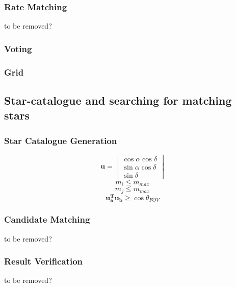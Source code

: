 \documentclass[12pt,a4paper,oneside]{article}
\begin{document}
\cite{mortari2004pyramid}\par


\subsubsection{Rate Matching}
\cite{samaan2005recursive}
to be removed?
\subsubsection{Voting}
\cite{kolomenkin2008geometric} \par
\subsubsection{Grid}
\cite{padgett1997grid}
\subsection{Star-catalogue and searching for matching stars}

\subsubsection{Star Catalogue Generation}
\begin{equation}
\bm{u} = \begin{bmatrix}
\cos \alpha \cos \delta \\
\sin \alpha \cos \delta \\
\sin \delta
\end{bmatrix}
\end{equation}
\begin{equation}
m_i \leq m_{max}
\end{equation}
\begin{equation}
m_j \leq m_{max}
\end{equation}
\begin{equation}
\bm{u_a^T u_b} \geq \cos \theta_{FOV}
\end{equation}

\subsubsection{Candidate Matching}
to be removed?
\subsubsection{Result Verification}
to be removed?
\end{document}
